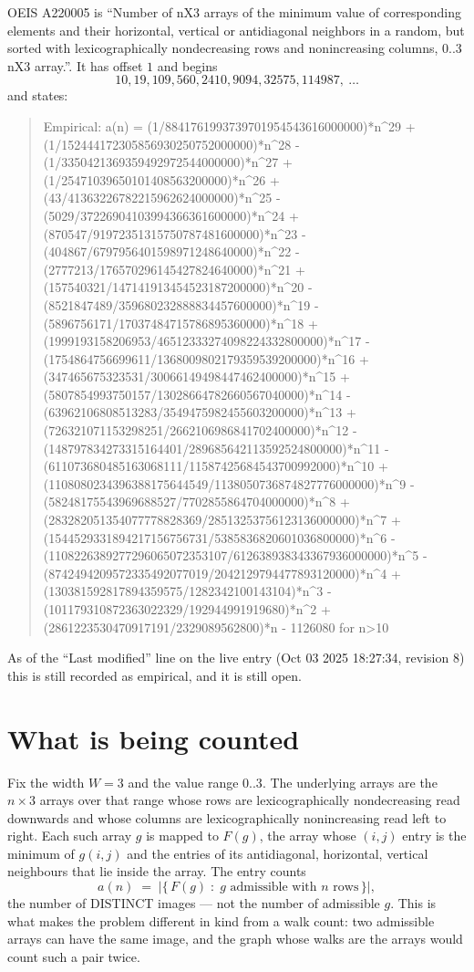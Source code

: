 \documentclass[11pt,a4paper]{article}
\theoremstyle{plain}
\theoremstyle{definition}
\begin{document}
OEIS A220005 is ``Number of nX3 arrays of the minimum value of corresponding elements and their horizontal, vertical or antidiagonal neighbors in a random, but sorted with lexicographically nondecreasing rows and nonincreasing columns, 0..3 nX3 array.''. It has offset $1$ and begins
\[
10, 19, 109, 560, 2410, 9094, 32575, 114987,\ \dots
\]
and states:
\begin{quote}
Empirical: a(n) = (1/8841761993739701954543616000000)*n\^{}29 + (1/152444172305856930250752000000)*n\^{}28 - (1/3350421369359492972544000000)*n\^{}27 + (1/25471039650101408563200000)*n\^{}26 + (43/41363226782215962624000000)*n\^{}25 - (5029/37226904103994366361600000)*n\^{}24 + (870547/91972351315750787481600000)*n\^{}23 - (404867/6797956401598971248640000)*n\^{}22 - (2777213/176570296145427824640000)*n\^{}21 + (157540321/147141913454523187200000)*n\^{}20 - (8521847489/359680232888834457600000)*n\^{}19 - (5896756171/17037484715786895360000)*n\^{}18 + (1999193158206953/46512333274098224332800000)*n\^{}17 - (1754864756699611/1368009802179359539200000)*n\^{}16 + (347465675323531/30066149498447462400000)*n\^{}15 + (5807854993750157/13028664782660567040000)*n\^{}14 - (63962106808513283/3549475982455603200000)*n\^{}13 + (726321071153298251/2662106986841702400000)*n\^{}12 - (148797834273315164401/289685642113592524800000)*n\^{}11 - (611073680485163068111/11587425684543700992000)*n\^{}10 + (1108080234396388175644549/1138050736874827776000000)*n\^{}9 - (58248175543969688527/7702855864704000000)*n\^{}8 + (283282051354077778828369/28513253756123136000000)*n\^{}7 + (1544529331894217156756731/5385836820601036800000)*n\^{}6 - (1108226389277296065072353107/612638938343367936000000)*n\^{}5 - (8742494209572335492077019/2042129794477893120000)*n\^{}4 + (130381592817894359575/1282342100143104)*n\^{}3 - (101179310872363022329/192944991919680)*n\^{}2 + (2861223530470917191/2329089562800)*n - 1126080 for n>10
\end{quote}
As of the ``Last modified'' line on the live entry (Oct 03 2025 18:27:34, revision 8)
this is still recorded as empirical, and it is still open.

\section{What is being counted}

Fix the width $W=3$ and the value range $0..3$. The underlying arrays are the
$n\times3$ arrays over that range whose rows are lexicographically nondecreasing read downwards
and whose columns are lexicographically nonincreasing read left to right. Each such array $g$
is mapped to $F(g)$, the array whose $(i,j)$ entry is the minimum of $g(i,j)$ and the entries
of its antidiagonal, horizontal, vertical neighbours that lie inside the array. The entry counts
\[
a(n)\;=\;\bigl|\{\,F(g)\;:\;g\text{ admissible with }n\text{ rows}\,\}\bigr|,
\]
the number of DISTINCT images --- not the number of admissible $g$. This is what makes the
problem different in kind from a walk count: two admissible arrays can have the same image, and
the graph whose walks are the arrays would count such a pair twice.
\end{document}
